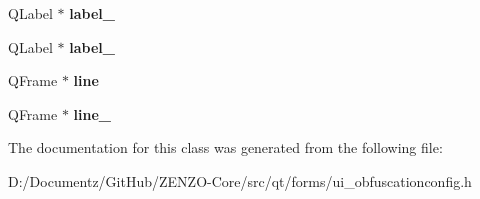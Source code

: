 \begin{DoxyCompactItemize}
Q\+Label $\ast$ {\bfseries label\+\_}
\item 
\mbox{\label{class_ui___obfuscation_config_a50d8a596cb710538b86a9e6c10a597f9}} 
Q\+Label $\ast$ {\bfseries label\+\_}
\item 
\mbox{\label{class_ui___obfuscation_config_a006ce9d967607c40a3300381c7f41d2b}} 
Q\+Frame $\ast$ {\bfseries line}
\item 
\mbox{\label{class_ui___obfuscation_config_a79359f8bf96c35d517597af74af7f588}} 
Q\+Frame $\ast$ {\bfseries line\+\_}
\end{DoxyCompactItemize}


The documentation for this class was generated from the following file\+:\begin{DoxyCompactItemize}
\item 
D\+:/\+Documentz/\+Git\+Hub/\+Z\+E\+N\+Z\+O-\/\+Core/src/qt/forms/ui\+\_\+obfuscationconfig.\+h\end{DoxyCompactItemize}
